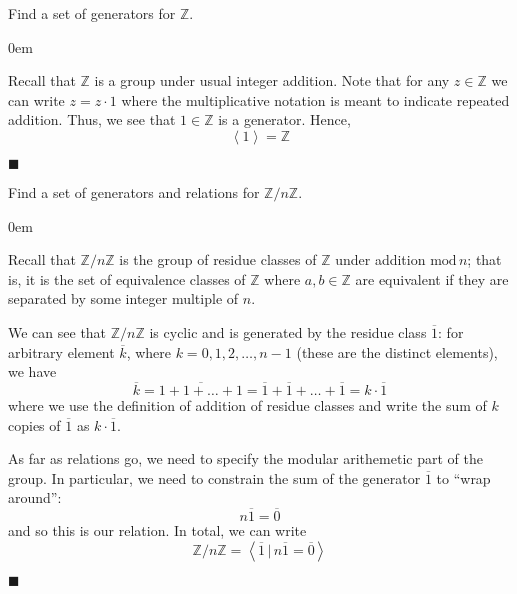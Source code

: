 \documentclass[12pt]{article}
\renewcommand{\qed}{\hfill$\blacksquare$}
\renewenvironment{proof}{\begin{addmargin}[1em]{0em}\begin{newproof}}{\end{newproof}\end{addmargin}\qed}
\newenvironment{problem}[2][Exercise]{\begin{trivlist}
\item[\hskip \labelsep {\bfseries #1}\hskip \labelsep {\bfseries #2.}]}{\end{trivlist}}
\begin{document}
\begin{problem}{1.2.14}
Find a set of generators for $\mathbb{Z}$.
\end{problem}
\begin{proof}
Recall that $\mathbb{Z}$ is a group under usual integer addition. Note that for any $z\in \mathbb{Z}$ we can write $z = z\cdot 1$ where the multiplicative notation is meant to indicate repeated addition. Thus, we see that $1\in \mathbb{Z}$ is a generator. Hence,
$$ \left\langle 1\right\rangle = \mathbb{Z} $$
\end{proof}


\begin{problem}{1.2.15}
Find a set of generators and relations for $\mathbb{Z}/n\mathbb{Z}$.
\end{problem}
\begin{proof}
Recall that $\mathbb{Z}/n\mathbb{Z}$ is the group of residue classes of $\mathbb{Z}$ under addition $\text{mod}\, n$; that is, it is the set of equivalence classes of $\mathbb{Z}$ where $a,b\in\mathbb{Z}$ are equivalent if they are separated by some integer multiple of $n$.

We can see that $\mathbb{Z}/n\mathbb{Z}$ is cyclic and is generated by the residue class $\overline{1}$: for arbitrary element $\overline{k}$, where $k=0,1,2,\ldots,n-1$ (these are the distinct elements), we have $$ \overline{k} = \overline{1+1+\ldots+1} = \overline{1}+\overline{1}+\ldots+\overline{1} = k\cdot \overline{1} $$ where we use the definition of addition of residue classes and write the sum of $k$ copies of $\overline{1}$ as $k\cdot \overline{1}$.

As far as relations go, we need to specify the modular arithemetic part of the group. In particular, we need to constrain the sum of the generator $\overline{1}$ to ``wrap around'':
$$ n\overline{1}=\overline{0} $$ and so this is our relation. In total, we can write
$$ \mathbb{Z}/n\mathbb{Z} = \left\langle \overline{1} \, | \, n\overline{1}=\overline{0} \right\rangle $$
\end{proof}
\end{document}
